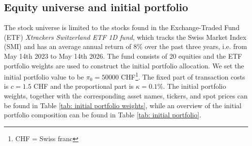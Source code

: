 \subsection{Equity universe and initial portfolio}
The stock universe is limited to the stocks found in the Exchange-Traded Fund (ETF) \textit{Xtrackers Switzerland ETF 1D fund}, which tracks the Swiss Market Index (SMI) and has an average annual return of 8\% over the past three years, i.e. from May 14th 2023 to May 14th 2026. The fund consists of 20 equities and the ETF portfolio weights are used to construct the initial portfolio allocation. We set the initial portfolio value to be $\pi_0=50000$ CHF\footnote{CHF = Swiss franc}. The fixed part of transaction costs is $c=1.5$ CHF and the proportional part is $\kappa=0.1\%$. The initial portfolio weights, together with the corresponding asset names, tickers, and spot prices can be found in Table \ref{tab: initial portfolio weights}, while an overview of the initial portfolio composition can be found in Table \ref{tab: initial portfolio}.


